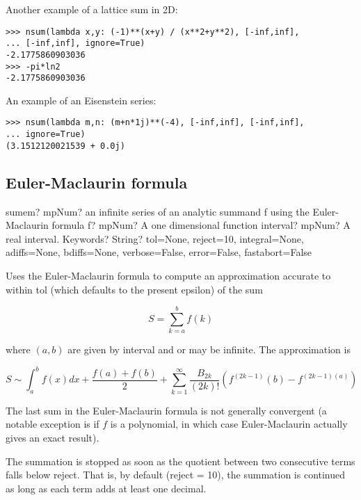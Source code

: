 Another example of a lattice sum in 2D:

\begin{lstlisting}
>>> nsum(lambda x,y: (-1)**(x+y) / (x**2+y**2), [-inf,inf],
... [-inf,inf], ignore=True)
-2.1775860903036
>>> -pi*ln2
-2.1775860903036
\end{lstlisting}

An example of an Eisenstein series:

\begin{lstlisting}
>>> nsum(lambda m,n: (m+n*1j)**(-4), [-inf,inf], [-inf,inf],
... ignore=True)
(3.1512120021539 + 0.0j)
\end{lstlisting}



\subsection{Euler-Maclaurin formula}

\begin{mpFunctionsExtract}
	\mpFunctionThree
	{sumem? mpNum? an infinite series of an analytic summand f using the Euler-Maclaurin formula}
	{f? mpNum? A one dimensional function}
	{interval? mpNum? A real interval.}	
	{Keywords? String?  tol=None, reject=10, integral=None, adiffs=None, bdiffs=None, verbose=False, error=False, fastabort=False}	
\end{mpFunctionsExtract}


\vpara
Uses the Euler-Maclaurin formula to compute an approximation accurate to within tol (which defaults to the present epsilon) of the sum

\begin{equation}
S=\sum_{k=a}^b f(k)
\end{equation}

where $(a,b)$ are given by interval and or may be infinite. The approximation is

\begin{equation}
S \sim \int_a^b f(x) dx + \frac{f(a)+f(b)}{2} + \sum_{k=1}^{\infty} \frac{B_{2k}}{(2k)!} \left(f^{(2k-1)}(b) - f^{(2k-1)(a)}  \right)
\end{equation}

The last sum in the Euler-Maclaurin formula is not generally convergent (a notable exception is if $f$ is a polynomial, in which case Euler-Maclaurin actually gives an exact result).

\vpara
The summation is stopped as soon as the quotient between two consecutive terms falls below reject. That is, by default (reject = 10), the summation is continued as long as each term adds at least one decimal.

